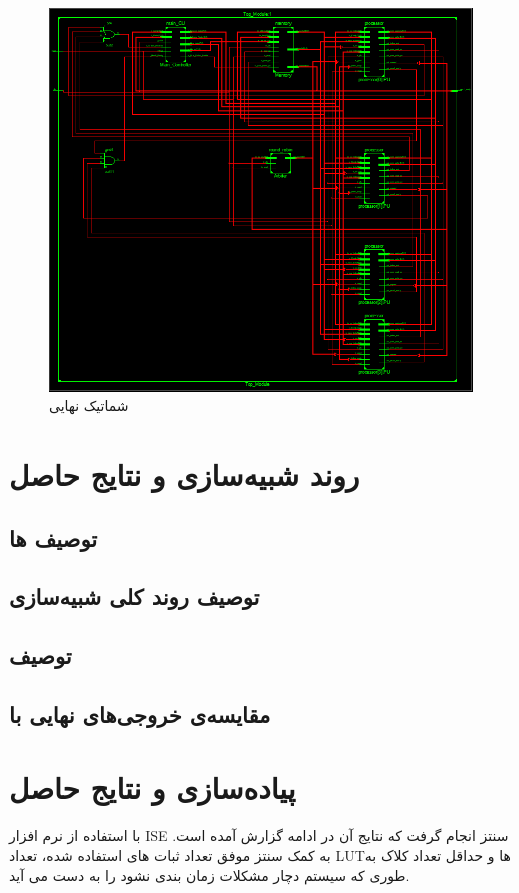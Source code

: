 \documentclass[12pt,onecolumn,a4paper,fleqn]{article}
\begin{document}
	\begin{figure}[h]
	\centering
	\includegraphics[width=0.95\linewidth]{source/scheeem.png}
	\caption{شماتیک نهایی }
\end{figure}


\pagebreak


\pagebreak
\section{روند شبیه‌سازی و نتایج حاصل}
\subsection{توصیف ها}
\subsection{توصیف روند کلی شبیه‌سازی}
\subsection{توصیف }
\subsection{مقایسه‌ی خروجی‌های نهایی با }

\section{پیاده‌سازی و نتایج حاصل}

با استفاده از نرم افزار ISE سنتز انجام گرفت که نتایج آن در ادامه گزارش آمده است.
به کمک سنتز موفق تعداد ثبات های استفاده شده، تعداد LUTها و حداقل تعداد کلاک به طوری که سیستم دچار مشکلات زمان بندی نشود را به دست می آید.
\end{document}
